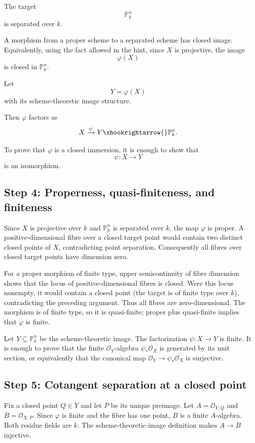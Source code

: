 The target
\[
\mathbb P_k^n
\]
is separated over $k$.

A morphism from a proper scheme to a separated scheme has closed image.
Equivalently, using the fact allowed in the hint, since $X$ is projective,
the image
\[
\varphi(X)
\]
is closed in $\mathbb P_k^n$.

Let
\[
Y=\varphi(X)
\]
with its scheme-theoretic image structure.

Then $\varphi$ factors as
\[
X\xrightarrow{\psi}Y\xhookrightarrow{} \mathbb P_k^n.
\]

To prove that $\varphi$ is a closed immersion, it is enough to show that
\[
\psi:X\to Y
\]
is an isomorphism.

\subsection*{Step 4: Properness, quasi-finiteness, and finiteness}

Since $X$ is projective over $k$ and $\mathbb P_k^n$ is separated over
$k$, the map $\varphi$ is proper. A positive-dimensional fibre over a
closed target point would contain two distinct closed points of $X$,
contradicting point separation. Consequently all fibres over closed target
points have dimension zero.

For a proper morphism of finite type, upper semicontinuity of fibre
dimension shows that the locus of positive-dimensional fibres is closed.
Were this locus nonempty, it would contain a closed point (the target is
of finite type over $k$), contradicting the preceding argument. Thus
all fibres are zero-dimensional. The morphism is of finite type, so it
is quasi-finite; proper plus quasi-finite implies that $\varphi$ is finite.

Let $Y\subseteq\mathbb P_k^n$ be the scheme-theoretic image. The
factorization $\psi:X\to Y$ is finite. It is enough to prove that the
finite $\mathcal O_Y$-algebra $\psi_*\mathcal O_X$ is generated by its
unit section, or equivalently that the canonical map
$\mathcal O_Y\to\psi_*\mathcal O_X$ is surjective.

\subsection*{Step 5: Cotangent separation at a closed point}

Fix a closed point $Q\in Y$ and let $P$ be its unique preimage.
Let $A=\mathcal O_{Y,Q}$ and $B=\mathcal O_{X,P}$.
Since $\varphi$ is finite and the fibre has one point, $B$ is a
finite $A$-algebra. Both residue fields are $k$.
The scheme-theoretic-image definition makes $A\to B$ injective.

